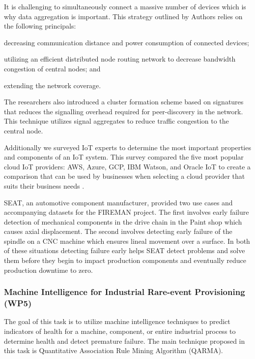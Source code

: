 It is challenging to simultaneously connect a massive number of devices which is why data aggregation is important.
This strategy outlined by Authors \cite{massive-machine} relies on the following principals:
\begin{inlinelist}
  \item decreasing communication distance and power consumption of connected devices;
  \item utilizing an efficient distributed node routing network to decrease bandwidth congestion of central nodes; and
  \item extending the network coverage.
\end{inlinelist}
The researchers also introduced a cluster formation scheme based on signatures that reduces the signalling overhead required for peer-discovery in the network. This technique utilizes signal aggregates to reduce traffic congestion to the central node.

Additionally we surveyed IoT experts to determine the most important properties and components of an IoT system. This survey compared the five most popular cloud IoT providers: AWS, Azure, GCP, IBM Watson, and Oracle IoT to create a comparison that can be used by businesses when selecting a cloud provider that suits their business needs \parencite{choose-iot-9110590}.

SEAT, an automotive component manufacturer, provided two use cases and accompanying datasets for the FIREMAN project. The first involves early failure detection of mechanical components in the drive chain in the Paint shop which causes axial displacement. The second involves detecting early failure of the spindle on a CNC machine which ensures lineal movement over a surface. In both of these situations detecting failure early helps SEAT detect problems and solve them before they begin to impact production components and eventually reduce production downtime to zero.

\subsubsection{Machine Intelligence for Industrial Rare-event Provisioning (WP5)}

The goal of this task is to utilize machine intelligence techniques to predict indicators of health for a machine, component, or entire industrial process to determine health and detect premature failure. The main technique proposed in this task is Quantitative Association Rule Mining Algorithm (QARMA).

